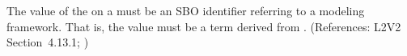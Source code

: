The value of the   on a \Reaction must be an SBO
identifier referring to a modeling framework.  That is, the value must
be a term derived from \sboevent.  (References: L2V2 Section~4.13.1; )
